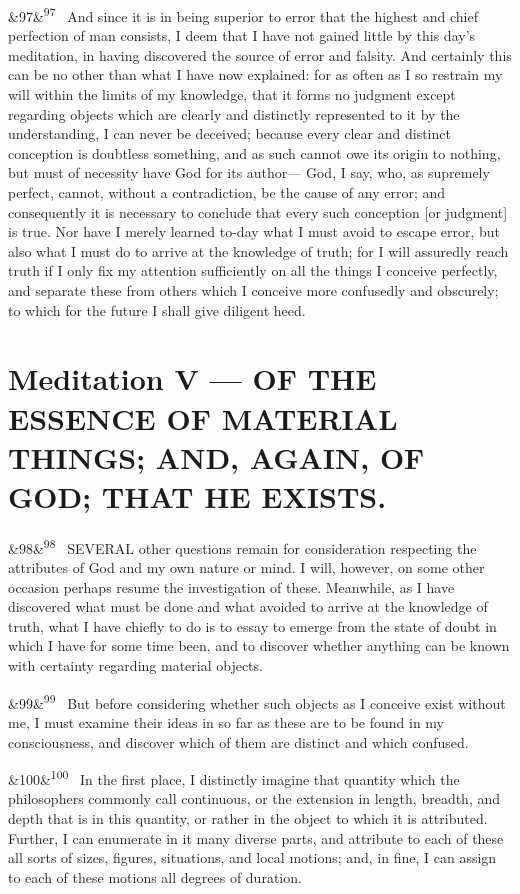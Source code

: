 \documentclass[12pt]{article}
\newcommand{\para}[1][]{\par\noindent\ifx&#1&\else\textsuperscript{\footnotesize #1}~\fi}
\begin{document}
\para[97] And since it is in being superior to error that the highest and chief perfection of man consists, I deem that I have not gained little by this day's meditation, in having discovered the source of error and falsity. And certainly this can be no other than what I have now explained: for as often as I so restrain my will within the limits of my knowledge, that it forms no judgment except regarding objects which are clearly and distinctly represented to it by the understanding, I can never be deceived; because every clear and distinct conception is doubtless something, and as such cannot owe its origin to nothing, but must of necessity have God for its author--- God, I say, who, as supremely perfect, cannot, without a contradiction, be the cause of any error; and consequently it is necessary to conclude that every such conception [or judgment] is true. Nor have I merely learned to-day what I must avoid to escape error, but also what I must do to arrive at the knowledge of truth; for I will assuredly reach truth if I only fix my attention sufficiently on all the things I conceive perfectly, and separate these from others which I conceive more confusedly and obscurely; to which for the future I shall give diligent heed.

\section*{Meditation V --- OF THE ESSENCE OF MATERIAL THINGS; AND, AGAIN, OF GOD; THAT HE EXISTS.}

\para[98] SEVERAL other questions remain for consideration respecting the attributes of God and my own nature or mind. I will, however, on some other occasion perhaps resume the investigation of these. Meanwhile, as I have discovered what must be done and what avoided to arrive at the knowledge of truth, what I have chiefly to do is to essay to emerge from the state of doubt in which I have for some time been, and to discover whether anything can be known with certainty regarding material objects.

\para[99] But before considering whether such objects as I conceive exist without me, I must examine their ideas in so far as these are to be found in my consciousness, and discover which of them are distinct and which confused.

\para[100] In the first place, I distinctly imagine that quantity which the philosophers commonly call continuous, or the extension in length, breadth, and depth that is in this quantity, or rather in the object to which it is attributed. Further, I can enumerate in it many diverse parts, and attribute to each of these all sorts of sizes, figures, situations, and local motions; and, in fine, I can assign to each of these motions all degrees of duration.
\end{document}
